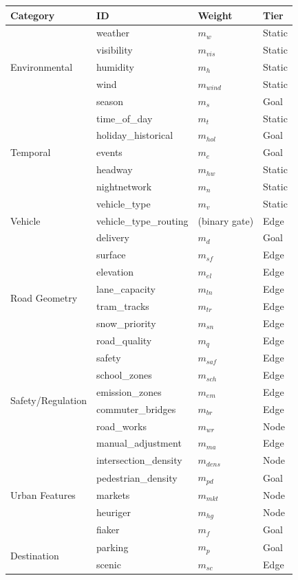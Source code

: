 \documentclass[12pt,a4paper]{article}
\begin{document}
\begin{center}
\small
\begin{tabular}{|l|l|l|l|}
\hline
\textbf{Category} & \textbf{ID} & \textbf{Weight} & \textbf{Tier} \\
\hline
\multirow{5}{*}{Environmental} & weather & $m_w$ & Static \\
& visibility & $m_{vis}$ & Static \\
& humidity & $m_h$ & Static \\
& wind & $m_{wind}$ & Static \\
& season & $m_s$ & Goal \\
\hline
\multirow{5}{*}{Temporal} & time\_of\_day & $m_t$ & Static \\
& holiday\_historical & $m_{hol}$ & Goal \\
& events & $m_e$ & Goal \\
& headway & $m_{hw}$ & Static \\
& nightnetwork & $m_n$ & Static \\
\hline
\multirow{3}{*}{Vehicle} & vehicle\_type & $m_v$ & Static \\
& vehicle\_type\_routing & (binary gate) & Edge \\
& delivery & $m_d$ & Goal \\
\hline
\multirow{6}{*}{Road Geometry} & surface & $m_{sf}$ & Edge \\
& elevation & $m_{el}$ & Edge \\
& lane\_capacity & $m_{ln}$ & Edge \\
& tram\_tracks & $m_{tr}$ & Edge \\
& snow\_priority & $m_{sn}$ & Edge \\
& road\_quality & $m_q$ & Edge \\
\hline
\multirow{6}{*}{Safety/Regulation} & safety & $m_{saf}$ & Edge \\
& school\_zones & $m_{sch}$ & Edge \\
& emission\_zones & $m_{em}$ & Edge \\
& commuter\_bridges & $m_{br}$ & Edge \\
& road\_works & $m_{wr}$ & Node \\
& manual\_adjustment & $m_{ma}$ & Edge \\
\hline
\multirow{5}{*}{Urban Features} & intersection\_density & $m_{dens}$ & Node \\
& pedestrian\_density & $m_{pd}$ & Goal \\
& markets & $m_{mkt}$ & Node \\
& heuriger & $m_{hg}$ & Node \\
& fiaker & $m_f$ & Goal \\
\hline
\multirow{2}{*}{Destination} & parking & $m_p$ & Goal \\
& scenic & $m_{sc}$ & Edge \\
\hline
\end{tabular}
\end{center}
\end{document}
